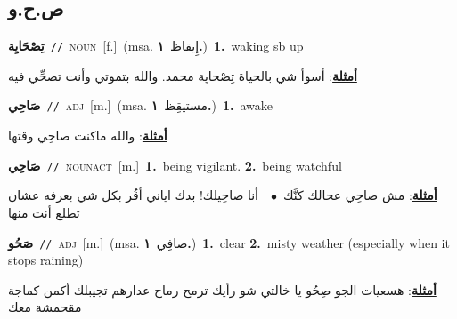 \documentclass[10pt,a4paper,twoside]{article} %
\begin{document}
\begin{multicols}{2}
\vspace{-3mm}
\subsection*{\color{blue}\foreignlanguage{arabic}{ص.ح.و}\color{blue}{}} 

{\setlength\topsep{0pt}\textbf{\foreignlanguage{arabic}{تِصْحَايِة}}\ {\color{gray}\texttt{//}\color{black}}\ \textsc{noun}\ [f.]\ \color{gray}(msa. \foreignlanguage{arabic}{إِيقاظ}~\foreignlanguage{arabic}{\textbf{١.}})\color{black}\ \textbf{1.}~waking sb up\  \begin{flushright}\color{gray}\foreignlanguage{arabic}{\textbf{\underline{\foreignlanguage{arabic}{أمثلة}}}: أسوأ شي بالحياة تِصْحايِة محمد. والله بتموتي وأنت تصحِّي فيه}\end{flushright}\color{black}} \vspace{2mm}

{\setlength\topsep{0pt}\textbf{\foreignlanguage{arabic}{صَاحِي}}\ {\color{gray}\texttt{//}\color{black}}\ \textsc{adj}\ [m.]\ \color{gray}(msa. \foreignlanguage{arabic}{مستيقِظ}~\foreignlanguage{arabic}{\textbf{١.}})\color{black}\ \textbf{1.}~awake\  \begin{flushright}\color{gray}\foreignlanguage{arabic}{\textbf{\underline{\foreignlanguage{arabic}{أمثلة}}}: والله ماكنت صاحِي وقتها}\end{flushright}\color{black}} \vspace{2mm}

{\setlength\topsep{0pt}\textbf{\foreignlanguage{arabic}{صَاحِي}}\ {\color{gray}\texttt{//}\color{black}}\ \textsc{noun\textunderscore act}\ [m.]\ \textbf{1.}~being vigilant.  \textbf{2.}~being watchful\  \begin{flushright}\color{gray}\foreignlanguage{arabic}{\textbf{\underline{\foreignlanguage{arabic}{أمثلة}}}: مش صاحِي عحالك كنَّك\ $\bullet$\ \  أنا صاحِيلك! بدك اياني أقُر بكل شي بعرفه عشان تطلع أنت منها}\end{flushright}\color{black}} \vspace{2mm}

{\setlength\topsep{0pt}\textbf{\foreignlanguage{arabic}{صَحُو}}\ {\color{gray}\texttt{//}\color{black}}\ \textsc{adj}\ [m.]\ \color{gray}(msa. \foreignlanguage{arabic}{صافِي}~\foreignlanguage{arabic}{\textbf{١.}})\color{black}\ \textbf{1.}~clear  \textbf{2.}~misty weather (especially when it stops raining)\  \begin{flushright}\color{gray}\foreignlanguage{arabic}{\textbf{\underline{\foreignlanguage{arabic}{أمثلة}}}: هسعيات الجو صِحُو يا خالتي شو رأيك ترمح رماح عدارهم تجيبلك أكمن كماجة مقحمشة معك}\end{flushright}\color{black}} \vspace{2mm}


\end{multicols}
\end{document}
